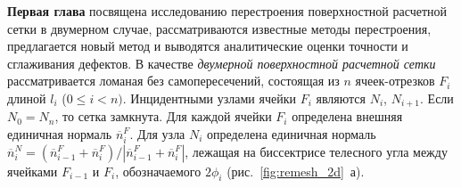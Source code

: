 \documentclass[a4paper,14pt]{extarticle}                     %
\theoremstyle{plain}                                         %
\begin{document}
\textbf{Первая глава} посвящена исследованию перестроения поверхностной расчетной сетки в двумерном случае, рассматриваются известные методы перестроения, предлагается новый метод и выводятся аналитические оценки точности и сглаживания дефектов.
В качестве \textit{двумерной поверхностной расчетной сетки} рассматривается ломаная без самопересечений, состоящая из $n$ ячеек-отрезков $F_i$ длиной $l_i$ ($0 \le i < n)$.
Инцидентными узлами ячейки $F_i$ являются $N_i$, $N_{i + 1}$.
Если $N_0 = N_n$, то сетка замкнута.
Для каждой ячейки $F_i$ определена внешняя единичная нормаль $\overline{n}_i^F$.
Для узла $N_i$ определена единичная нормаль $\overline{n}_i^N = (\overline{n}_{i-1}^F + \overline{n}_i^F) / |\overline{n}_{i-1}^F + \overline{n}_i^F|$, лежащая на биссектрисе телесного угла между ячейками $F_{i - 1}$ и $F_i$, обозначаемого $2 \phi_i$ (рис.~\ref{fig:remesh_2d}~а).
\end{document}
